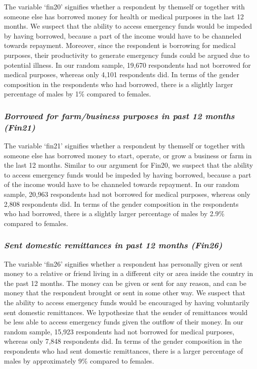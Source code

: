 \documentclass[12pt]{article}
\begin{document}
The variable `fin20' signifies whether a respondent by themself or
together with someone else has borrowed money for health or medical
purposes in the last 12 months. We suspect that the ability to access
emergency funds would be impeded by having borrowed, because a part of
the income would have to be channeled towards repayment. Moreover, since
the respondent is borrowing for medical purposes, their productivity to
generate emergency funds could be argued due to potential illness. In
our random sample, 19,670 respondents had not borrowed for medical
purposes, whereas only 4,101 respondents did. In terms of the gender
composition in the respondents who had borrowed, there is a slightly
larger percentage of males by 1\% compared to females.

\hypertarget{borrowed-for-farmbusiness-purposes-in-past-12-months-fin21}{%
\subsubsection{\texorpdfstring{\emph{Borrowed for farm/business purposes
in past 12 months
(Fin21)}}{Borrowed for farm/business purposes in past 12 months (Fin21)}}\label{borrowed-for-farmbusiness-purposes-in-past-12-months-fin21}}

The variable `fin21' signifies whether a respondent by themself or
together with someone else has borrowed money to start, operate, or grow
a business or farm in the last 12 months. Similar to our argument for
Fin20, we suspect that the ability to access emergency funds would be
impeded by having borrowed, because a part of the income would have to
be channeled towards repayment. In our random sample, 20,963 respondents
had not borrowed for medical purposes, whereas only 2,808 respondents
did. In terms of the gender composition in the respondents who had
borrowed, there is a slightly larger percentage of males by 2.9\%
compared to females.

\hypertarget{sent-domestic-remittances-in-past-12-months-fin26}{%
\subsubsection{\texorpdfstring{\emph{Sent domestic remittances in past
12 months
(Fin26)}}{Sent domestic remittances in past 12 months (Fin26)}}\label{sent-domestic-remittances-in-past-12-months-fin26}}

The variable `fin26' signifies whether a respondent has personally given
or sent money to a relative or friend living in a different city or area
inside the country in the past 12 months. The money can be given or sent
for any reason, and can be money that the respondent brought or sent in
some other way. We suspect that the ability to access emergency funds
would be encouraged by having voluntarily sent domestic remittances. We
hypothesize that the sender of remittances would be less able to access
emergency funds given the outflow of their money. In our random sample,
15,923 respondents had not borrowed for medical purposes, whereas only
7,848 respondents did. In terms of the gender composition in the
respondents who had sent domestic remittances, there is a larger
percentage of males by approximately 9\% compared to females.
\end{document}
